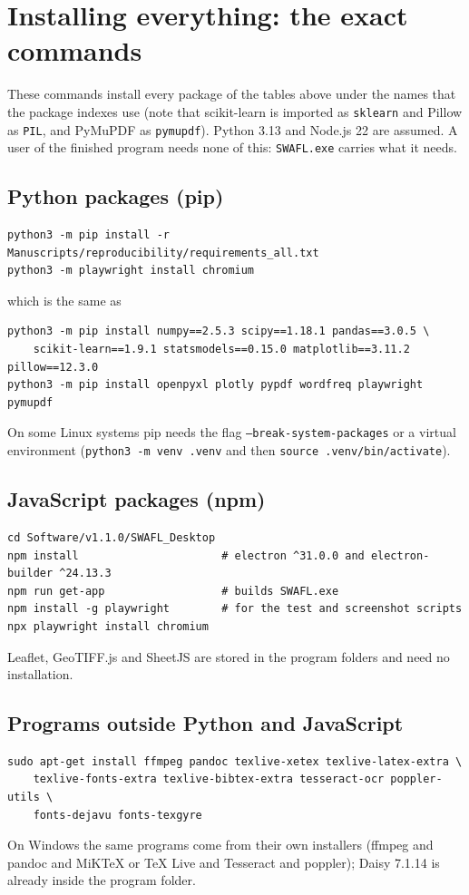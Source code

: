 \section{Installing everything: the exact commands}
These commands install every package of the tables above under the names that the package indexes use (note that scikit-learn is imported as \texttt{sklearn} and Pillow as \texttt{PIL}, and PyMuPDF as \texttt{pymupdf}). Python 3.13 and Node.js 22 are assumed. A user of the finished program needs none of this: \texttt{SWAFL.exe} carries what it needs.

\subsection{Python packages (pip)}
\begin{verbatim}
python3 -m pip install -r Manuscripts/reproducibility/requirements_all.txt
python3 -m playwright install chromium
\end{verbatim}
which is the same as
\begin{verbatim}
python3 -m pip install numpy==2.5.3 scipy==1.18.1 pandas==3.0.5 \
    scikit-learn==1.9.1 statsmodels==0.15.0 matplotlib==3.11.2 pillow==12.3.0
python3 -m pip install openpyxl plotly pypdf wordfreq playwright pymupdf
\end{verbatim}
On some Linux systems pip needs the flag \texttt{--break-system-packages} or a virtual environment (\texttt{python3 -m venv .venv} and then \texttt{source .venv/bin/activate}).

\subsection{JavaScript packages (npm)}
\begin{verbatim}
cd Software/v1.1.0/SWAFL_Desktop
npm install                      # electron ^31.0.0 and electron-builder ^24.13.3
npm run get-app                  # builds SWAFL.exe
npm install -g playwright        # for the test and screenshot scripts
npx playwright install chromium
\end{verbatim}
Leaflet, GeoTIFF.js and SheetJS are stored in the program folders and need no installation.

\subsection{Programs outside Python and JavaScript}
\begin{verbatim}
sudo apt-get install ffmpeg pandoc texlive-xetex texlive-latex-extra \
    texlive-fonts-extra texlive-bibtex-extra tesseract-ocr poppler-utils \
    fonts-dejavu fonts-texgyre
\end{verbatim}
On Windows the same programs come from their own installers (ffmpeg and pandoc and MiKTeX or TeX Live and Tesseract and poppler); Daisy 7.1.14 is already inside the program folder.


